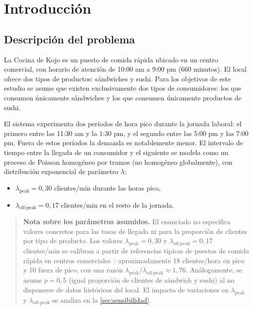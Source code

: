 \section{Introducción}

\subsection{Descripción del problema}

La Cocina de Kojo es un puesto de comida rápida ubicado en un centro
comercial, con horario de atención de 10:00 am a 9:00 pm (660 minutos).
El local ofrece dos tipos de productos: sándwiches y sushi.
Para los objetivos de este estudio se asume que existen exclusivamente dos
tipos de consumidores: los que consumen únicamente sándwiches y los que
consumen únicamente productos de sushi.

El sistema experimenta dos períodos de hora pico durante la jornada laboral:
el primero entre las 11:30 am y la 1:30 pm, y el segundo entre las 5:00 pm
y las 7:00 pm.
Fuera de estos períodos la demanda es notablemente menor.
El intervalo de tiempo entre la llegada de un consumidor y el siguiente
se modela como un proceso de Poisson homogéneo por tramos (no homogéneo
globalmente), con distribución exponencial de parámetro $\lambda$:
\begin{itemize}
  \item $\lambda_{\text{peak}} = 0{,}30$ clientes/min durante las horas pico,
  \item $\lambda_{\text{off-peak}} = 0{,}17$ clientes/min en el resto de la jornada.
\end{itemize}

\begin{quote}
\textbf{Nota sobre los parámetros asumidos.}
El enunciado no especifica valores concretos para las tasas de llegada ni
para la proporción de clientes por tipo de producto.
Los valores $\lambda_{\text{peak}} = 0{,}30$ y $\lambda_{\text{off-peak}} = 0{,}17$
clientes/min se calibran a partir de referencias típicas de puestos de comida
rápida en centros comerciales~\citep{banks2010discrete}: aproximadamente
18 clientes/hora en pico y 10 fuera de pico, con una razón
$\lambda_{\text{peak}} / \lambda_{\text{off-peak}} \approx 1{,}76$.
Análogamente, se asume $p = 0{,}5$ (igual proporción de clientes de sándwich
y sushi) al no disponerse de datos históricos del local.
El impacto de variaciones en $\lambda_{\text{peak}}$ y $\lambda_{\text{off-peak}}$
se analiza en la \cref{sec:sensibilidad}.
\end{quote}


